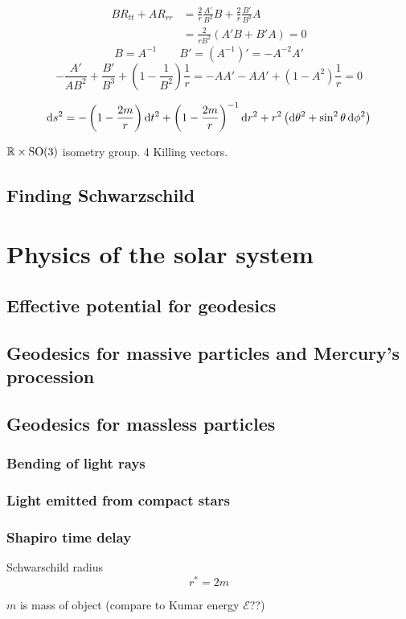 \begin{align*} BR_{tt} + AR_{rr} &= \frac{2}{r}\frac{A'}{B^2}B + \frac{2}{r}\frac{B'}{B^2}A \\
&= \frac{2}{rB^2}\left(A'B + B'A\right) = 0
\end{align*}
\[ B=A^{-1} \qquad B' = (A^{-1})' = -A^{-2}A' \]
\[ - \frac{A'}{AB^2}+ \frac{B'}{B^3} + \left(1- \frac{1}{B^2}\right)\frac{1}{r} = -AA' - AA' + (1-A^2)\frac{1}{r} = 0 \]

\[ \operatorname{d \!}{s}^2 = - \left(1- \frac{2m}{r}\right)\operatorname{d \!}{t}^2 + \left(1- \frac{2m}{r}\right)^{-1}\operatorname{d \!}{r}^2 + r^2 \left(\operatorname{d \!}{\theta}^2 + \sin^2\theta \operatorname{d \!}{\phi}^2\right) \]

$\mathbb{R}\times\operatorname{SO}(3)$ isometry group. 4 Killing vectors.
\section{Finding Schwarzschild}

\chapter{Physics of the solar system}
\section{Effective potential for geodesics}
\section{Geodesics for massive particles and Mercury's procession}
\section{Geodesics for massless particles}
\subsection{Bending of light rays}
\subsection{Light emitted from compact stars}
\subsection{Shapiro time delay}


Schwarschild radius
\[ r^* = 2m \]

$m$ is mass of object (compare to Kumar energy $\mathcal{E}$??)

